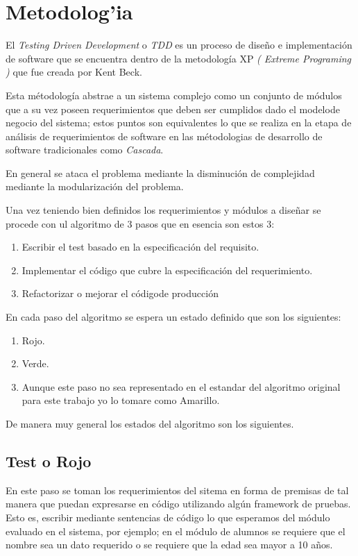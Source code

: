 \chapter{Metodolog'ia}

El \textit{Testing Driven Development} o \textit{TDD} es un proceso de dise\~no e implementaci\'on de software que se encuentra dentro de la metodolog\'ia XP \textit{( Extreme Programing )} que fue creada por Kent Beck.

Esta m\'etodolog\'ia abstrae a un sistema complejo como un conjunto de m\'odulos que a su vez poseen requerimientos que deben ser cumplidos dado el modelode negocio del sistema;
estos puntos son equivalentes lo que se realiza en la etapa de an\'alisis de requerimientos de software en las m\'etodologias de desarrollo de software tradicionales como
\textit{Cascada}.

En general se ataca el problema mediante la disminuci\'on de complejidad mediante la modularizaci\'on del problema.


Una vez teniendo bien definidos los requerimientos y m\'odulos a dise\~nar se procede con ul algoritmo de 3 pasos que en esencia son estos 3:
\begin{enumerate}
    \item Escribir el test basado en la especificación del requisito.
    \item Implementar el c\'odigo que cubre la especificaci\'on del requerimiento.
    \item Refactorizar o mejorar el c\'odigode producci\'on
\end{enumerate}

En cada paso del algoritmo se espera un estado definido que son los siguientes:
\begin{enumerate}
    \item Rojo.
    \item Verde.
    \item Aunque este paso no sea representado en el estandar del algoritmo original para este trabajo yo lo tomare como Amarillo.
\end{enumerate}

De manera muy general los estados del algoritmo son los siguientes.

\section{Test o Rojo}
En este paso se toman los requerimientos del sitema en forma de premisas de tal manera que puedan expresarse en código utilizando algún framework de pruebas.
Esto es, escribir mediante sentencias de código lo que esperamos del m\'odulo evaluado en el sistema, por ejemplo; en el m\'odulo de alumnos se requiere que el nombre sea
un dato requerido o se requiere que la edad sea mayor a 10 a\~nos.

